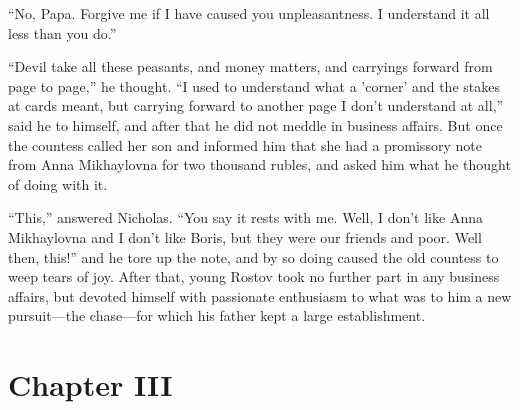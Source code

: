 ``No, Papa. Forgive me if I have caused you unpleasantness. I
understand it all less than you do.''

``Devil take all these peasants, and money matters, and carryings
forward from page to page,'' he thought. ``I used to understand
what a 'corner' and the stakes at cards meant, but carrying
forward to another page I don't understand at all,'' said he to
himself, and after that he did not meddle in business
affairs. But once the countess called her son and informed him
that she had a promissory note from Anna Mikhaylovna for two
thousand rubles, and asked him what he thought of doing with it.

``This,'' answered Nicholas. ``You say it rests with me. Well, I
don't like Anna Mikhaylovna and I don't like Boris, but they were
our friends and poor. Well then, this!'' and he tore up the note,
and by so doing caused the old countess to weep tears of
joy. After that, young Rostov took no further part in any
business affairs, but devoted himself with passionate enthusiasm
to what was to him a new pursuit---the chase---for which his
father kept a large establishment.


\chapter*{Chapter III}
\ifaudio     
{} 
\fi

